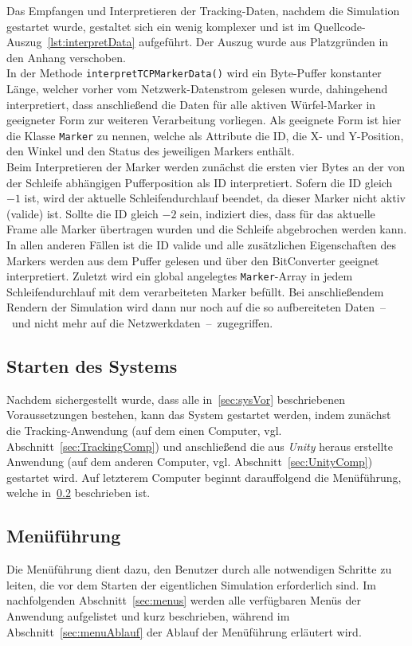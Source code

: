 Das Empfangen und Interpretieren der Tracking-Daten, nachdem die Simulation gestartet wurde, gestaltet sich ein wenig komplexer und ist im Quellcode-Auszug~\ref{lst:interpretData} aufgeführt. Der Auszug wurde aus Platzgründen in den Anhang verschoben.\\
In der Methode \texttt{interpretTCPMarkerData()} wird ein Byte-Puffer konstanter Länge, welcher vorher vom Netzwerk-Datenstrom gelesen wurde, dahingehend interpretiert, dass anschließend die Daten für alle aktiven Würfel-Marker in geeigneter Form zur weiteren Verarbeitung vorliegen. Als geeignete Form ist hier die Klasse \texttt{Marker} zu nennen, welche als Attribute die ID, die X- und Y-Position, den Winkel und den Status des jeweiligen Markers enthält.\\ 
Beim Interpretieren der Marker werden zunächst die ersten vier Bytes an der von der Schleife abhängigen Pufferposition als ID interpretiert. Sofern die ID gleich $-1$ ist, wird der aktuelle Schleifendurchlauf beendet, da dieser Marker nicht aktiv (valide) ist. Sollte die ID gleich $-2$ sein, indiziert dies, dass für das aktuelle Frame alle Marker übertragen wurden und die Schleife abgebrochen werden kann. In allen anderen Fällen ist die ID valide und alle zusätzlichen Eigenschaften des Markers werden aus dem Puffer gelesen und über den BitConverter geeignet interpretiert. Zuletzt wird ein global angelegtes \texttt{Marker}-Array in jedem Schleifendurchlauf mit dem verarbeiteten Marker befüllt. Bei anschließendem Rendern der Simulation wird dann nur noch auf die so aufbereiteten Daten~--~und nicht mehr auf die Netzwerkdaten~--~zugegriffen.

\subsection{Starten des Systems}%
Nachdem sichergestellt wurde, dass alle in~\ref{sec:sysVor} beschriebenen Voraussetzungen bestehen, kann das System gestartet werden, indem zunächst die Tracking-Anwendung (auf dem einen Computer, vgl. Abschnitt~\ref{sec:TrackingComp}) und anschließend die aus \emph{Unity} heraus erstellte Anwendung (auf dem anderen Computer, vgl. Abschnitt~\ref{sec:UnityComp}) gestartet wird. Auf letzterem Computer beginnt darauffolgend die Menüführung, welche in~\ref{sec:menu} beschrieben ist.
\subsection{Menüführung}\label{sec:menu}%
Die Menüführung dient dazu, den Benutzer durch alle notwendigen Schritte zu leiten, die vor dem Starten der eigentlichen Simulation erforderlich sind. Im nachfolgenden Abschnitt~\ref{sec:menus} werden alle verfügbaren Menüs der Anwendung aufgelistet und kurz beschrieben, während im Abschnitt~\ref{sec:menuAblauf} der Ablauf der Menüführung erläutert wird.


